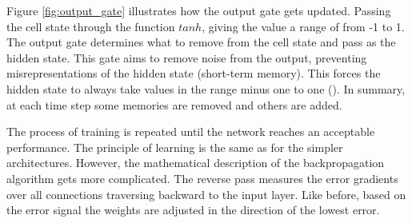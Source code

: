 Figure \ref{fig:output_gate} illustrates how the output gate gets updated. Passing the cell state through the function $tanh$, giving the value a range of from -1 to 1. The output gate determines what to remove from the cell state and pass as the hidden state. This gate aims to remove noise from the output, preventing misrepresentations of the hidden state (short-term memory). This forces the hidden state to always take values in the range minus one to one (\cite{Hochreiter1997LongMemory}).  In summary, at each time step some memories are removed and others are added. 



The process of training is repeated until the network reaches an acceptable performance. The principle of learning is the same as for the simpler architectures. However, the mathematical description of the backpropagation algorithm gets more complicated. The reverse pass measures the error gradients over all connections traversing backward to the input layer. Like before, based on the error signal the weights are adjusted in the direction of the lowest error.


